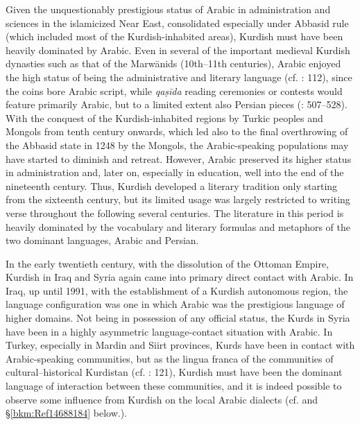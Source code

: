 \documentclass[output=paper]{langsci/langscibook}
\begin{document}
Given the unquestionably prestigious status of Arabic in administration and sciences in the islamicized Near East, consolidated especially under Abbasid rule (which included most of the Kurdish-inhabited areas), Kurdish must have been heavily dominated by Arabic. Even in several of the important medieval Kurdish dynasties such as that of the Marwānids (10th–11th centuries), Arabic enjoyed the high status of being the administrative and literary language (cf. \citealt{James2007}: 112), since the coins bore Arabic script, while \textit{qaṣīda} reading ceremonies or contests would feature primarily Arabic, but to a limited extent also Persian pieces (\citealt{Ripper2012}: 507–528). With the conquest of the Kurdish-inhabited regions by Turkic peoples and Mongols from tenth century onwards, which led also to the final overthrowing of the Abbasid state in 1248 by the Mongols, the Arabic-speaking populations may have started to diminish and retreat. However, Arabic preserved its higher status in administration and, later on, especially in education, well into the end of the nineteenth century. Thus, Kurdish developed a literary tradition only starting from the sixteenth century, but its limited usage was largely restricted to writing verse throughout the following several centuries. The literature in this period is heavily dominated by the vocabulary and literary formulas and metaphors of the two dominant languages, Arabic and Persian. 

In the early twentieth century, with the dissolution of the Ottoman Empire, Kurdish in Iraq and Syria again came into primary direct contact with Arabic. In Iraq, up until 1991, with the establishment of a Kurdish autonomous region, the language configuration was one in which Arabic was the prestigious language of higher domains. Not being in possession of any official status, the Kurds in Syria have been in a highly asymmetric language-contact situation with Arabic. In Turkey, especially in Mardin and Siirt provinces, Kurds have been in contact with Arabic-speaking communities, but as the lingua franca of the communities of cultural–historical Kurdistan (cf. \citealt{Edwards1851}: 121), Kurdish must have been the dominant language of interaction between these communities, and it is indeed possible to observe some influence from Kurdish on the local Arabic dialects (cf. \citealt{Jastrow2011Kurdish} and §\ref{bkm:Ref14688184} below.). 
\end{document}
